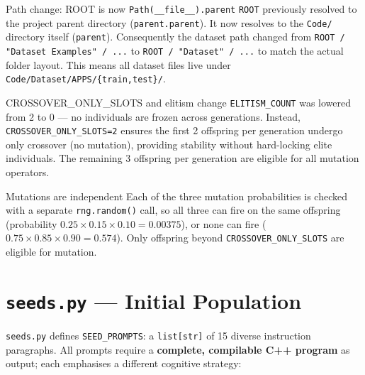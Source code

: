 \documentclass[11pt,a4paper]{report}
\newcommand{\fn}[1]{\texttt{#1}}
\newcommand{\pyf}[1]{\texttt{#1}}
\begin{document}
\begin{concept}{Path change: ROOT is now \fn{Path(\_\_file\_\_).parent}}
\fn{ROOT} previously resolved to the project parent directory (\fn{parent.parent}).
It now resolves to the \fn{Code/} directory itself (\fn{parent}).
Consequently the dataset path changed from \fn{ROOT / "Dataset Examples" / ...}
to \fn{ROOT / "Dataset" / ...} to match the actual folder layout.
This means all dataset files live under \fn{Code/Dataset/APPS/\{train,test\}/}.
\end{concept}

\begin{concept}{CROSSOVER\_ONLY\_SLOTS and elitism change}
\fn{ELITISM\_COUNT} was lowered from 2 to 0 --- no individuals are frozen across
generations.  Instead, \fn{CROSSOVER\_ONLY\_SLOTS=2} ensures the first 2 offspring per
generation undergo only crossover (no mutation), providing stability without hard-locking
elite individuals.  The remaining 3 offspring per generation are eligible for all mutation
operators.
\end{concept}

\begin{concept}{Mutations are independent}
Each of the three mutation probabilities is checked with a separate \fn{rng.random()}
call, so all three can fire on the same offspring (probability $0.25 \times 0.15 \times
0.10 = 0.00375$), or none can fire ($0.75 \times 0.85 \times 0.90 = 0.574$).
Only offspring beyond \fn{CROSSOVER\_ONLY\_SLOTS} are eligible for mutation.
\end{concept}


\chapter{\pyf{seeds.py} --- Initial Population}

\pyf{seeds.py} defines \fn{SEED\_PROMPTS}: a \texttt{list[str]} of 15 diverse
instruction paragraphs.  All prompts require a \textbf{complete, compilable C++ program}
as output; each emphasises a different cognitive strategy:
\end{document}
